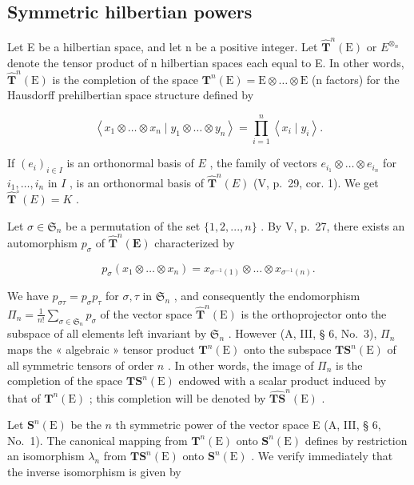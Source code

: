 \subsection{Symmetric hilbertian powers}

Let E be a hilbertian space, and let n be a positive integer. Let \(\hat{\mathbf{T}}^{n}(\mathrm{E})\) or \(E^{\otimes_{n}}\) denote the tensor product of n hilbertian spaces each equal to E. In other words, \(\hat{\mathbf{T}}^{n}(\mathrm{E})\) is the completion of the space \(\mathbf{T}^{n}(\mathrm{E}) = \mathrm{E} \otimes \ldots \otimes \mathrm{E}\) (n factors) for the Hausdorff prehilbertian space structure defined by

\[
\left\langle x _ {1} \otimes \dots \otimes x _ {n} \mid y _ {1} \otimes \dots \otimes y _ {n} \right\rangle = \prod_ {i = 1} ^ {n} \left\langle x _ {i} \mid y _ {i} \right\rangle .
\]

If \((e_i)_{i\in I}\) is an orthonormal basis of \(E\) , the family of vectors \(e_{i_1} \otimes \ldots \otimes e_{i_n}\) for \(i_1, \ldots, i_n\) in \(I\) , is an orthonormal basis of \(\hat{\mathbf{T}}^n(E)\) (V, p.~29, cor. 1). We get \(\hat{\mathbf{T}}^\circ(E) = K\) .

Let \(\sigma \in \mathfrak{S}_n\) be a permutation of the set \(\{1, 2, ..., n\}\) . By V, p.~27, there exists an automorphism \(p_{\sigma}\) of \(\hat{\mathbf{T}}^n(\mathbf{E})\) characterized by

\[
p _ {\sigma} (x _ {1} \otimes \dots \otimes x _ {n}) = x _ {\sigma^ {- 1} (1)} \otimes \dots \otimes x _ {\sigma^ {- 1} (n)}.
\]

We have \(p_{\sigma \tau} = p_{\sigma}p_{\tau}\) for \(\sigma, \tau\) in \(\mathfrak{S}_n\) , and consequently the endomorphism \(\Pi_n = \frac{1}{n!}\sum_{\sigma \in \mathfrak{S}_n}p_\sigma\) of the vector space \(\hat{\mathbf{T}}^n (\mathrm{E})\) is the orthoprojector onto the subspace of all elements left invariant by \(\mathfrak{S}_n\) . However (A, III, § 6, No.~3), \(\Pi_n\) maps the « algebraic » tensor product \(\mathbf{T}^n (\mathrm{E})\) onto the subspace \(\mathbf{T}\mathbf{S}^n (\mathrm{E})\) of all symmetric tensors of order \(n\) . In other words, the image of \(\Pi_n\) is the completion of the space \(\mathbf{T}\mathbf{S}^n (\mathrm{E})\) endowed with a scalar product induced by that of \(\mathbf{T}^n (\mathrm{E})\) ; this completion will be denoted by \(\widehat{\mathbf{T}\mathbf{S}}^n (\mathrm{E})\) .

Let \(\mathbf{S}^n (\mathrm{E})\) be the \(n\) th symmetric power of the vector space E (A, III, § 6, No.~1). The canonical mapping from \(\mathbf{T}^n (\mathrm{E})\) onto \(\mathbf{S}^n (\mathrm{E})\) defines by restriction an isomorphism \(\lambda_{n}\) from \(\mathbf{TS}^n (\mathrm{E})\) onto \(\mathbf{S}^n (\mathrm{E})\) . We verify immediately that the inverse isomorphism is given by

